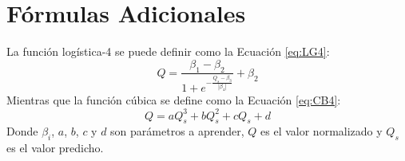 \section*{Fórmulas Adicionales}
\label{ape:Formulas}
La función logística-4 se puede definir como la Ecuación \eqref{eq:LG4}:
\begin{equation}
Q = \frac{\beta_1 - \beta_2}{1 + e^{-\frac{Q_s-\beta_3}{|\beta_4|}}} + \beta_2 
\label{eq:LG4}
\end{equation}
Mientras que la función cúbica se define como la Ecuación \eqref{eq:CB4}:
\begin{equation}
Q = aQ_s^3 + bQ_s^2 + cQ_s + d
\label{eq:CB4}
\end{equation}
Donde $\beta_i$, $a$, $b$, $c$ y $d$ son parámetros a aprender, $Q$ es el valor 
normalizado y $Q_s$ es el valor predicho.
